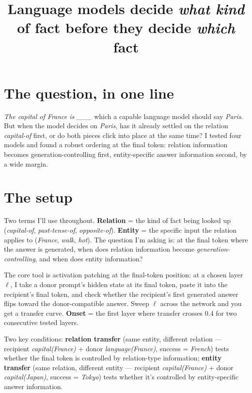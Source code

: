 \documentclass[10pt]{article}
\title{\vspace{-2.5em}\textbf{Language models decide \emph{what kind} of fact before they decide \emph{which} fact}\vspace{-0.5em}}
\author{}
\date{}
\begin{document}
\maketitle
\vspace{-3em}

\section*{The question, in one line}

\emph{The capital of France is \_\_\_} which a capable language model should say \emph{Paris}. But when the model decides on \emph{Paris}, has it already settled on the relation \emph{capital-of} first, or do both pieces click into place at the same time? I tested four models and found a robust ordering at the final token: relation information becomes generation-controlling first, entity-specific answer information second, by a wide margin.

\section*{The setup}

Two terms I'll use throughout. \textbf{Relation} = the kind of fact being looked up (\emph{capital-of}, \emph{past-tense-of}, \emph{opposite-of}). \textbf{Entity} = the specific input the relation applies to (\emph{France}, \emph{walk}, \emph{hot}). The question I'm asking is: at the final token where the answer is generated, when does relation information become \emph{generation-controlling}, and when does entity information?

The core tool is activation patching at the final-token position: at a chosen layer $\ell$, I take a donor prompt's hidden state at its final token, paste it into the recipient's final token, and check whether the recipient's first generated answer flips toward the donor-compatible answer. Sweep $\ell$ across the network and you get a transfer curve. \textbf{Onset} = the first layer where transfer crosses 0.4 for two consecutive tested layers.

Two key conditions: \textbf{relation transfer} (same entity, different relation --- recipient \emph{capital(France)} + donor \emph{language(France)}, success = \emph{French}) tests whether the final token is controlled by relation-type information; \textbf{entity transfer} (same relation, different entity --- recipient \emph{capital(France)} + donor \emph{capital(Japan)}, success = \emph{Tokyo}) tests whether it's controlled by entity-specific answer information.
\end{document}
